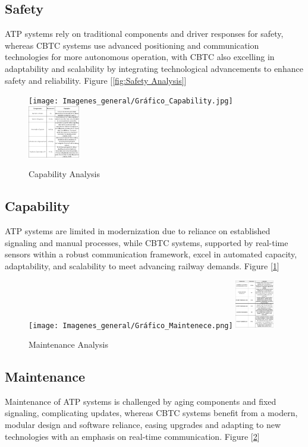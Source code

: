 \documentclass[conference]{IEEEtran}
\begin{document}
\subsection{Safety}
ATP systems rely on traditional components and driver responses for safety, whereas CBTC systems use advanced positioning and communication technologies for more autonomous operation, with CBTC also excelling in adaptability and scalability by integrating technological advancements to enhance safety and reliability. Figure [\ref{fig:Safety Analysis}]\\
\begin{figure}[h]
    \centering
    \texttt{[image: Imagenes\_general/Gráfico\_Capability.jpg]}
    \includegraphics[width=0.20\textwidth,scale=1]{Imagenes_general/Tabla_Capability.png}
    \caption{Capability Analysis}
    \label{fig:Capability Analysis}
\end{figure}
\subsection{Capability}
ATP systems are limited in modernization due to reliance on established signaling and manual processes, while CBTC systems, supported by real-time sensors within a robust communication framework, excel in automated capacity, adaptability, and scalability to meet advancing railway demands. Figure [\ref{fig:Capability Analysis}]\\
\begin{figure}[h]
    \centering
        \texttt{[image: Imagenes\_general/Gráfico\_Maintenece.png]}
    \includegraphics[width=0.15\textwidth,scale=1]{Imagenes_general/Tabla_Maintenece.jpg}
    \caption{Maintenance Analysis}
    \label{fig:Maintenance Analysis}
\end{figure}
\subsection{Maintenance}
Maintenance of ATP systems is challenged by aging components and fixed signaling, complicating updates, whereas CBTC systems benefit from a modern, modular design and software reliance, easing upgrades and adapting to new technologies with an emphasis on real-time communication. Figure [\ref{fig:Maintenance Analysis}]\\
\end{document}
